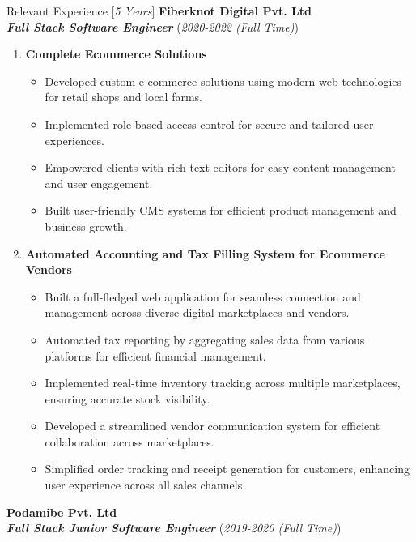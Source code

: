 \documentclass{resume} %
\begin{document}
\begin{rSection}{Relevant Experience [\textit{5 Years}]}
    \large{{\bf Fiberknot Digital Pvt. Ltd}}
    \\ \small{\textit{\textbf{Full Stack Software Engineer}}} (\small{\textit{2020-2022 (Full Time)}})

    \begin{enumerate}
        \item \textbf{Complete Ecommerce Solutions}
              \begin{itemize}
                  \item Developed custom e-commerce solutions using modern web technologies for retail shops and local farms.
                  \item Implemented role-based access control for secure and tailored user experiences.
                  \item Empowered clients with rich text editors for easy content management and user engagement.
                  \item Built user-friendly CMS systems for efficient product management and business growth.
              \end{itemize}

        \item \textbf{Automated Accounting and Tax Filling System for Ecommerce Vendors}
              \begin{itemize}
                  \item Built a full-fledged web application for seamless connection and management across diverse digital marketplaces and vendors.
                  \item Automated tax reporting by aggregating sales data from various platforms for efficient financial management.
                  \item Implemented real-time inventory tracking across multiple marketplaces, ensuring accurate stock visibility.
                  \item Developed a streamlined vendor communication system for efficient collaboration across marketplaces.
                  \item Simplified order tracking and receipt generation for customers, enhancing user experience across all sales channels.
              \end{itemize}
    \end{enumerate}

    \large{{\bf Podamibe Pvt. Ltd}}
    \\ \small{\textit{\textbf{Full Stack Junior Software Engineer}}} (\small{\textit{2019-2020 (Full Time)}})


\end{rSection}
\end{document}
